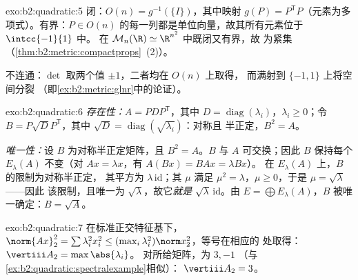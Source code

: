 \begin{solution}{exo:b2:quadratic:5}
闭：$O(n) = g^{-1}(\{I\})$，其中映射 $g(P) =
P^{\mathsf T}P$（元素为多项式）。有界：$P
\in O(n)$ 的每一列都是单位向量，故其所有元素位于 $\intcc{-1}{1}$ 中。
在 $\mathcal{M}_n(\R) \simeq \R^{n^2}$ 中既闭又有界，故
为紧集（\cref{thm:b2:metric:compactprops}~(2)）。

不连通：$\det$ 取两个值 $\pm1$，二者均在 $O(n)$ 上取得，
而满射到 $\{-1, 1\}$ 上将空间分裂
（即\cref{ex:b2:metric:glnr}中的论证）。
\end{solution}

\begin{solution}{exo:b2:quadratic:6}
\emph{存在性：}$A = PDP^{\mathsf T}$，其中 $D =
\operatorname{diag}(\lambda_i)$，$\lambda_i \geq 0$；令 $B =
P\sqrt D P^{\mathsf T}$，其中 $\sqrt D =
\operatorname{diag}(\sqrt{\lambda_i})$：对称且
半正定，$B^2 = A$。

\emph{唯一性：}设 $B$ 为对称半正定矩阵，且 $B^2 = A$。$B$
与 $A$ 可交换；因此 $B$ 保持每个
$E_\lambda(A)$ 不变（对 $Ax = \lambda x$，有 $A(Bx) = BAx = \lambda Bx$）。
在 $E_\lambda(A)$ 上，$B$ 的限制为对称半正定，
其平方为 $\lambda\,\mathrm{id}$；其 $\mu$ 满足 $\mu^2
= \lambda$，$\mu \geq 0$，于是 $\mu = \sqrt\lambda$——因此
该限制，且唯一为
$\sqrt\lambda$，故它\emph{就是} $\sqrt\lambda\,\mathrm{id}$。由 $E =
\bigoplus E_\lambda(A)$，$B$ 被唯一确定：$B = \sqrt A$。
\end{solution}

\begin{solution}{exo:b2:quadratic:7}
在标准正交特征基下，$\norm{Ax}_2^2 = \sum \lambda_i^2
x_i^2 \leq (\max_i \lambda_i^2)\norm x_2^2$，等号在相应的
处取得：$\vertiii A_2 = \max\abs{\lambda_i}$。
对所给矩阵，为 $3, -1$
（与\cref{ex:b2:quadratic:spectralexample}相似）：
$\vertiii A_2 = 3$。
\end{solution}

